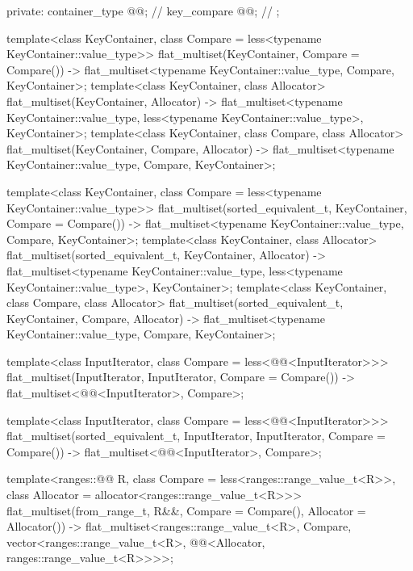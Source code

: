 \begin{codeblock}
{{  private:
    container_type @@;           // \expos
    key_compare @@;        // \expos
  };

  template<class KeyContainer, class Compare = less<typename KeyContainer::value_type>>
    flat_multiset(KeyContainer, Compare = Compare())
      -> flat_multiset<typename KeyContainer::value_type, Compare, KeyContainer>;
  template<class KeyContainer, class Allocator>
    flat_multiset(KeyContainer, Allocator)
      -> flat_multiset<typename KeyContainer::value_type,
                       less<typename KeyContainer::value_type>, KeyContainer>;
  template<class KeyContainer, class Compare, class Allocator>
    flat_multiset(KeyContainer, Compare, Allocator)
      -> flat_multiset<typename KeyContainer::value_type, Compare, KeyContainer>;

  template<class KeyContainer, class Compare = less<typename KeyContainer::value_type>>
    flat_multiset(sorted_equivalent_t, KeyContainer, Compare = Compare())
      -> flat_multiset<typename KeyContainer::value_type, Compare, KeyContainer>;
  template<class KeyContainer, class Allocator>
    flat_multiset(sorted_equivalent_t, KeyContainer, Allocator)
      -> flat_multiset<typename KeyContainer::value_type,
                       less<typename KeyContainer::value_type>, KeyContainer>;
  template<class KeyContainer, class Compare, class Allocator>
    flat_multiset(sorted_equivalent_t, KeyContainer, Compare, Allocator)
      -> flat_multiset<typename KeyContainer::value_type, Compare, KeyContainer>;

  template<class InputIterator, class Compare = less<@@<InputIterator>>>
    flat_multiset(InputIterator, InputIterator, Compare = Compare())
      -> flat_multiset<@@<InputIterator>, Compare>;

  template<class InputIterator, class Compare = less<@@<InputIterator>>>
    flat_multiset(sorted_equivalent_t, InputIterator, InputIterator, Compare = Compare())
      -> flat_multiset<@@<InputIterator>, Compare>;

  template<ranges::@@ R, class Compare = less<ranges::range_value_t<R>>,
           class Allocator = allocator<ranges::range_value_t<R>>>
    flat_multiset(from_range_t, R&&, Compare = Compare(), Allocator = Allocator())
      -> flat_multiset<ranges::range_value_t<R>, Compare,
                       vector<ranges::range_value_t<R>,
                              @@<Allocator, ranges::range_value_t<R>>>>;

}
\end{codeblock}
